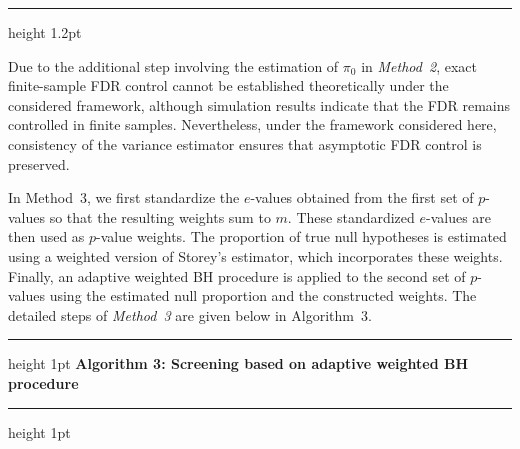\documentclass[11pt]{article}
\numberwithin{equation}{section}
\theoremstyle{plain}
\theoremstyle{remark}
\begin{document}
\vspace{0.4em}
\hrule height 1.2pt
\vspace{0.5em}

Due to the additional step involving the estimation of $\pi_0$ in \textit{Method~2}, exact finite-sample FDR control cannot be established theoretically under the considered framework, although simulation results indicate that the FDR remains controlled in finite samples. Nevertheless, under the framework considered here, consistency of the variance estimator ensures that asymptotic FDR control is preserved.

In Method~3, we first standardize the $e$-values obtained from the first set of $p$-values so that the resulting weights sum to $m$. These standardized $e$-values are then used as $p$-value weights. The proportion of true null hypotheses is estimated using a weighted version of Storey’s estimator, which incorporates these weights. Finally, an adaptive weighted BH procedure is applied to the second set of $p$-values using the estimated null proportion and the constructed weights. The detailed steps of \textit{Method~3} are given below in Algorithm~3.

\vspace{0.4em}
\hrule height 1pt
\vspace{0.25em}
\noindent\textbf{Algorithm 3: Screening based on adaptive weighted BH procedure}
\vspace{0.35em}
\hrule height 1pt
\vspace{0.3em}
\end{document}
